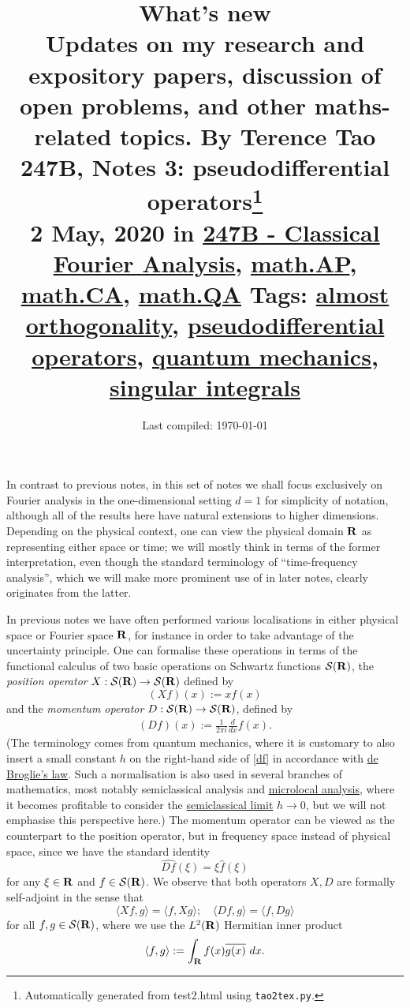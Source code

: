 \documentclass[11pt]{article}
\title{{\normalsize What's new\\Updates on my research and expository papers, discussion of open problems, and other maths-related topics.  By Terence Tao}\\247B, Notes 3: pseudodifferential operators\footnote{Automatically generated from test2.html using \texttt{tao2tex.py}.}\\ \footnotesize 2 May, 2020 in \href{https://terrytao.wordpress.com/category/teaching/247b-classical-fourier-analysis/}{247B - Classical Fourier Analysis}, \href{https://terrytao.wordpress.com/category/mathematics/mathap/}{math.AP}, \href{https://terrytao.wordpress.com/category/mathematics/mathca/}{math.CA}, \href{https://terrytao.wordpress.com/category/mathematics/mathqa/}{math.QA} \textbar Tags: \href{https://terrytao.wordpress.com/tag/almost-orthogonality/}{almost orthogonality}, \href{https://terrytao.wordpress.com/tag/pseudodifferential-operators/}{pseudodifferential operators}, \href{https://terrytao.wordpress.com/tag/quantum-mechanics/}{quantum mechanics}, \href{https://terrytao.wordpress.com/tag/singular-integrals/}{singular integrals} }
\author{}
\date{Last compiled: \today}
\theoremstyle{definition}
\begin{document}
\maketitle

 In contrast to previous notes, in this set of notes we shall focus exclusively on Fourier analysis in the one-dimensional setting \({d=1}\) for simplicity of notation, although all of the results here have natural extensions to higher dimensions. Depending on the physical context, one can view the physical domain \({{\bf R}}\) as representing either space or time; we will mostly think in terms of the former interpretation, even though the standard terminology of “time-frequency analysis”, which we will make more prominent use of in later notes, clearly originates from the latter.


In previous notes we have often performed various localisations in either physical space or Fourier space \({{\bf R}}\), for instance in order to take advantage of the uncertainty principle. One can formalise these operations in terms of the functional calculus of two basic operations on Schwartz functions \({{\mathcal S}({\bf R})}\), the \emph{position operator} \({X: {\mathcal S}({\bf R}) \rightarrow {\mathcal S}({\bf R})}\) defined by 
\[\displaystyle  (Xf)(x) := x f(x)\]
 and the \emph{momentum operator} \({D: {\mathcal S}({\bf R}) \rightarrow {\mathcal S}({\bf R})}\), defined by 
\begin{align}\label{df}
  (Df)(x) := \frac{1}{2\pi i} \frac{d}{dx} f(x). 
\end{align}
 (The terminology comes from quantum mechanics, where it is customary to also insert a small constant \({h}\) on the right-hand side of \eqref{df} in accordance with \href{https://en.wikipedia.org/wiki/Matter_wave}{de Broglie’s law}. Such a normalisation is also used in several branches of mathematics, most notably semiclassical analysis and \href{https://en.wikipedia.org/wiki/Microlocal_analysis}{microlocal analysis}, where it becomes profitable to consider the \href{https://en.wikipedia.org/wiki/Semiclassical_physics}{semiclassical limit} \({h \rightarrow 0}\), but we will not emphasise this perspective here.) The momentum operator can be viewed as the counterpart to the position operator, but in frequency space instead of physical space, since we have the standard identity 
\[\displaystyle  \widehat{Df}(\xi) = \xi \hat f(\xi)\]
 for any \({\xi \in {\bf R}}\) and \({f \in {\mathcal S}({\bf R})}\). We observe that both operators \({X,D}\) are formally self-adjoint in the sense that 
\[\displaystyle  \langle Xf, g \rangle = \langle f, Xg \rangle; \quad \langle Df, g \rangle = \langle f, Dg \rangle\]
 for all \({f,g \in {\mathcal S}({\bf R})}\), where we use the \({L^2({\bf R})}\) Hermitian inner product 
\[\displaystyle  \langle f, g\rangle := \int_{\bf R} f(x) \overline{g(x)}\ dx.\]
\end{document}
